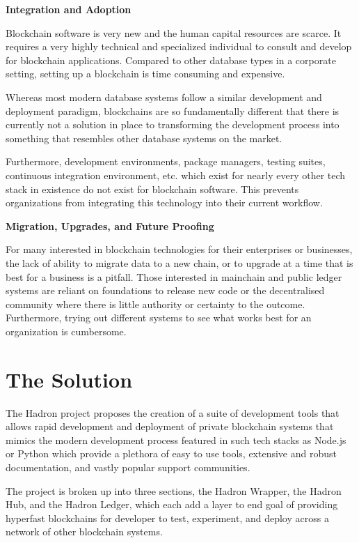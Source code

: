 \documentclass{%
	article}
\begin{document}
\begin{center}
\textbf{Integration and Adoption}
\end{center}
Blockchain software is very new and the human capital resources are scarce. It requires a very highly technical and specialized individual to consult and develop for blockchain applications. Compared to other database types in a corporate setting, setting up a blockchain is time consuming and expensive. 

Whereas most modern database systems follow a similar development and deployment paradigm, blockchains are so fundamentally different that there is currently not a solution in place to transforming the development process into something that resembles other database systems on the market.

Furthermore, development environments, package managers, testing suites, continuous integration environment, etc. which exist for nearly every other tech stack in existence do not exist for blockchain software. This prevents organizations from integrating this technology into their current workflow.

\begin{center}
\textbf{Migration, Upgrades, and Future Proofing}
\end{center}

For many interested in blockchain technologies for their enterprises or businesses, the lack of ability to migrate data to a new chain, or to upgrade at a time that is best for a business is a pitfall. Those interested in mainchain and public ledger systems are reliant on foundations to release new code or the decentralised community where there is little authority or certainty to the outcome. Furthermore, trying out different systems to see what works best for an organization is cumbersome.

\section{The Solution}

The Hadron project proposes the creation of a suite of development tools that allows rapid development and deployment of private blockchain systems that mimics the modern development process featured in such tech stacks as Node.js or Python which provide a plethora of easy to use tools, extensive and robust documentation, and vastly popular support communities.

The project is broken up into three sections, the Hadron Wrapper, the Hadron Hub, and the Hadron Ledger, which each add a layer to end goal of providing hyperfast blockchains for developer to test, experiment, and deploy across a network of other blockchain systems.
\end{document}
